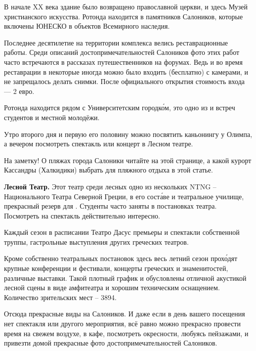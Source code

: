 В начале XX века здание было возвращено православной церкви, и  здесь Музей христианского искусства. Ротонда находится в  памятников Салоников, которые включены ЮНЕСКО в  объектов Всемирного наследия.

Последнее десятилетие на территории комплекса велись реставрационные работы. Среди описаний достопримечательностей Салоников фото этих работ часто встречаются в рассказах путешественников на форумах. Ведь и во время реставрации в некоторые  иногда можно было входить (бесплатно) с камерами, и не запрещалось делать снимки. После официального открытия стоимость входа — 2 евро.

Ротонда находится рядом с Университетским городк\'{о}м, это одно из  и встреч студентов и местной молодёжи.

Утро второго дня и первую его половину можно посвятить каньонингу у Олимпа, а вечером посмотреть спектакль или концерт в Лесном театре.

На заметку! О пляжах  города Салоники читайте на этой странице, а какой курорт Кассандры (Халкидики) выбрать для пляжного отдыха в этой статье.

\textbf{Лесной Театр.}  Этот театр среди лесных  одно из нескольких  NTNG – Национального Театра Северной Греции, в его сост\'{а}ве и театральное училище, прекрасный резерв для . Студенты часто заняты в постановках театра. Посмотреть на спектакль действительно интересно.

Каждый сезон в расписании Театро Дасус премьеры и  спектакли собственной труппы, гастрольные выступления других греческих театров.

Кроме собственно театральных постановок здесь весь летний сезон прох\'{о}дят крупные конференции и фестивали, концерты греческих и  знаменитостей, различные выставки. Такой плотный график и  обусловлены отличной акустикой лесной сцены в виде амфитеатра и хорошим техническим оснащением. Количество зрительских мест -- 3894.

Отсюда прекрасные виды на  Салоников. И даже если в день вашего посещения нет спектакля или другого мероприятия, всё равно можно прекрасно провести время на свежем воздухе, в кафе, посмотреть окресности, любуясь пейзажами, и привезти домой прекрасные фото достопримечательностей Салоников.

